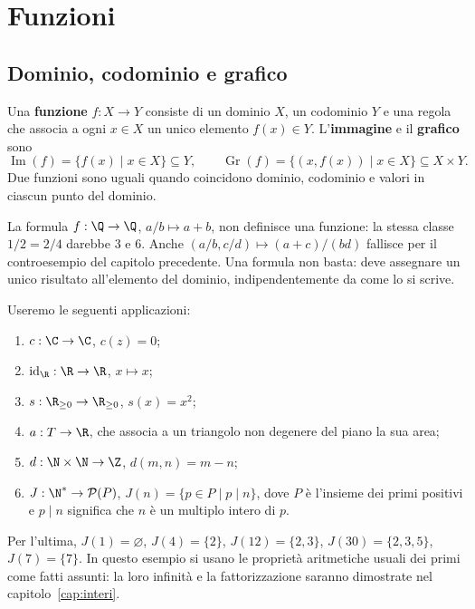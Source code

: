 \chapter{Funzioni}

\section{Dominio, codominio e grafico}
\begin{definizione}
Una \textbf{funzione} $f:X\to Y$ consiste di un dominio $X$, un codominio $Y$ e una regola che associa a ogni $x\in X$ un unico elemento $f(x)\in Y$. L'\textbf{immagine} e il \textbf{grafico} sono
\[
\operatorname{Im}(f)=\{f(x)\mid x\in X\}\subseteq Y,\qquad
\operatorname{Gr}(f)=\{(x,f(x))\mid x\in X\}\subseteq X\times Y.
\]
Due funzioni sono uguali quando coincidono dominio, codominio e valori in ciascun punto del dominio.
\end{definizione}

\begin{esempio}
La formula $f:\Q\to\Q$, $a/b\mapsto a+b$, non definisce una funzione: la stessa classe $1/2=2/4$ darebbe $3$ e $6$. Anche $(a/b,c/d)\mapsto(a+c)/(bd)$ fallisce per il controesempio del capitolo precedente. Una formula non basta: deve assegnare un unico risultato all'elemento del dominio, indipendentemente da come lo si scrive.
\end{esempio}

\begin{esempio}
Useremo le seguenti applicazioni:
\begin{enumerate}[label=\alph*)]
\item $c:\C\to\C$, $c(z)=0$;
\item $\operatorname{id}_{\R}:\R\to\R$, $x\mapsto x$;
\item $s:\R_{\ge0}\to\R_{\ge0}$, $s(x)=x^2$;
\item $a:T\to\R$, che associa a un triangolo non degenere del piano la sua area;
\item $d:\N\times\N\to\Z$, $d(m,n)=m-n$;
\item $J:\N^*\to\mathcal P(P)$, $J(n)=\{p\in P\mid p\mid n\}$, dove $P$ è l'insieme dei primi positivi e $p\mid n$ significa che $n$ è un multiplo intero di $p$.
\end{enumerate}
Per l'ultima, $J(1)=\varnothing$, $J(4)=\{2\}$, $J(12)=\{2,3\}$, $J(30)=\{2,3,5\}$, $J(7)=\{7\}$. In questo esempio si usano le proprietà aritmetiche usuali dei primi come fatti assunti: la loro infinità e la fattorizzazione saranno dimostrate nel capitolo~\ref{cap:interi}.
\end{esempio}

